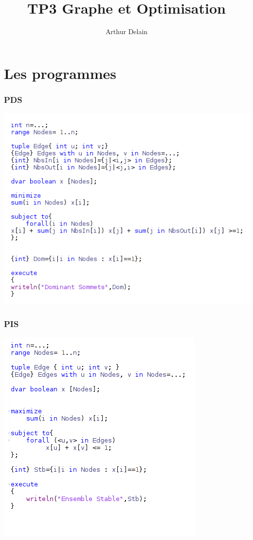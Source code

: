 \documentclass{article}\author{Arthur Delain}
\title{TP3 Graphe et Optimisation}
\date{}
\begin{document}
\maketitle
\part{Les programmes}
\section{PDS}
\includegraphics[scale=1]{PDS.png} 
\section{PIS}
\includegraphics[scale=1]{PIS.png} 
\end{document}
